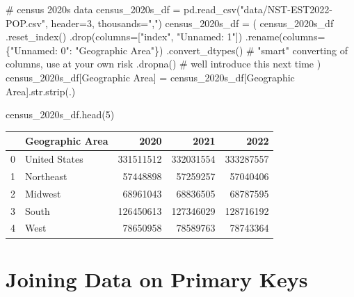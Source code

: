 \documentclass[
  letterpaper,
  DIV=11,
  numbers=noendperiod]{scrreprt}
\newenvironment{Shaded}{\begin{snugshade}}{\end{snugshade}}
\newcommand{\BuiltInTok}[1]{\textcolor[rgb]{0.00,0.23,0.31}{#1}}
\newcommand{\CommentTok}[1]{\textcolor[rgb]{0.37,0.37,0.37}{#1}}
\newcommand{\DecValTok}[1]{\textcolor[rgb]{0.68,0.00,0.00}{#1}}
\newcommand{\NormalTok}[1]{\textcolor[rgb]{0.00,0.23,0.31}{#1}}
\newcommand{\OperatorTok}[1]{\textcolor[rgb]{0.37,0.37,0.37}{#1}}
\newcommand{\StringTok}[1]{\textcolor[rgb]{0.13,0.47,0.30}{#1}}
\begin{document}
\begin{Shaded}
\begin{Highlighting}[]
\CommentTok{\# census 2020s data}
\NormalTok{census\_2020s\_df }\OperatorTok{=}\NormalTok{ pd.read\_csv(}\StringTok{"data/NST{-}EST2022{-}POP.csv"}\NormalTok{, header}\OperatorTok{=}\DecValTok{3}\NormalTok{, thousands}\OperatorTok{=}\StringTok{","}\NormalTok{)}
\NormalTok{census\_2020s\_df }\OperatorTok{=}\NormalTok{ (}
\NormalTok{    census\_2020s\_df}
\NormalTok{    .reset\_index()}
\NormalTok{    .drop(columns}\OperatorTok{=}\NormalTok{[}\StringTok{"index"}\NormalTok{, }\StringTok{"Unnamed: 1"}\NormalTok{])}
\NormalTok{    .rename(columns}\OperatorTok{=}\NormalTok{\{}\StringTok{"Unnamed: 0"}\NormalTok{: }\StringTok{"Geographic Area"}\NormalTok{\})}
\NormalTok{    .convert\_dtypes()                 }\CommentTok{\# "smart" converting of columns, use at your own risk}
\NormalTok{    .dropna()                         }\CommentTok{\# we\textquotesingle{}ll introduce this next time}
\NormalTok{)}
\NormalTok{census\_2020s\_df[}\StringTok{\textquotesingle{}Geographic Area\textquotesingle{}}\NormalTok{] }\OperatorTok{=}\NormalTok{ census\_2020s\_df[}\StringTok{\textquotesingle{}Geographic Area\textquotesingle{}}\NormalTok{].}\BuiltInTok{str}\NormalTok{.strip(}\StringTok{\textquotesingle{}.\textquotesingle{}}\NormalTok{)}

\NormalTok{census\_2020s\_df.head(}\DecValTok{5}\NormalTok{)}
\end{Highlighting}
\end{Shaded}

\begin{tabular}{llrrr}
\toprule
{} & Geographic Area &       2020 &       2021 &       2022 \\
\midrule
0 &   United States &  331511512 &  332031554 &  333287557 \\
1 &       Northeast &   57448898 &   57259257 &   57040406 \\
2 &         Midwest &   68961043 &   68836505 &   68787595 \\
3 &           South &  126450613 &  127346029 &  128716192 \\
4 &            West &   78650958 &   78589763 &   78743364 \\
\bottomrule
\end{tabular}

\hypertarget{joining-data-on-primary-keys}{%
\section{Joining Data on Primary
Keys}\label{joining-data-on-primary-keys}}
\end{document}
